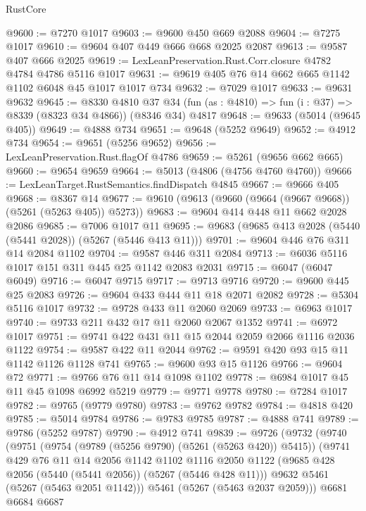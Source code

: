 \begin{lexlean}{RustCore}
\begin{coremodule}
@9600 := @7270 @1017
@9603 := @9600 @450 @669 @2088
@9604 := @7275 @1017
@9610 := @9604 @407 @449 @666 @668 @2025 @2087
@9613 := @9587 @407 @666 @2025
@9619 := LexLeanPreservation.Rust.Corr.closure @4782 @4784 @4786 @5116 @1017
@9631 := @9619 @405 @76 @14 @662 @665 @1142 @1102 @6048 @45 @1017 @1017 @734
@9632 := @7029 @1017
@9633 := @9631 @9632
@9645 := @8330
    @4810
    @37
    @34
    (fun (as : @4810) => fun (i : @37) => @8339 (@8323 @34 @4866))
    (@8346 @34)
    @4817
@9648 := @9633 (@5014 (@9645 @405))
@9649 := @4888 @734
@9651 := @9648 (@5252 @9649)
@9652 := @4912 @734
@9654 := @9651 (@5256 @9652)
@9656 := LexLeanPreservation.Rust.flagOf @4786
@9659 := @5261 (@9656 @662 @665)
@9660 := @9654 @9659
@9664 := @5013 (@4806 (@4756 @4760 @4760))
@9666 := LexLeanTarget.RustSemantics.findDispatch @4845
@9667 := @9666 @405
@9668 := @8367 @14
@9677 := @9610 (@9613 (@9660 (@9664 (@9667 @9668)) (@5261 (@5263 @405)) @5273))
@9683 := @9604 @414 @448 @11 @662 @2028 @2086
@9685 := @7006 @1017 @11
@9695 := @9683 (@9685 @413 @2028 (@5440 (@5441 @2028)) (@5267 (@5446 @413 @11)))
@9701 := @9604 @446 @76 @311 @14 @2084 @1102
@9704 := @9587 @446 @311 @2084
@9713 := @6036 @5116 @1017 @151 @311 @445 @25 @1142 @2083 @2031
@9715 := @6047 (@6047 @6049)
@9716 := @6047 @9715
@9717 := @9713 @9716
@9720 := @9600 @445 @25 @2083
@9726 := @9604 @433 @444 @11 @18 @2071 @2082
@9728 := @5304 @5116 @1017
@9732 := @9728 @433 @11 @2060 @2069
@9733 := @6963 @1017
@9740 := @9733 @211 @432 @17 @11 @2060 @2067 @1352
@9741 := @6972 @1017
@9751 := @9741 @422 @431 @11 @15 @2044 @2059 @2066 @1116 @2036 @1122
@9754 := @9587 @422 @11 @2044
@9762 := @9591 @420 @93 @15 @11 @1142 @1126 @1128 @741
@9765 := @9600 @93 @15 @1126
@9766 := @9604 @72
@9771 := @9766 @76 @11 @14 @1098 @1102
@9778 := @6984 @1017 @45 @11 @45 @1098 @6992 @5219
@9779 := @9771 @9778
@9780 := @7284 @1017
@9782 := @9765 (@9779 @9780)
@9783 := @9762 @9782
@9784 := @4818 @420
@9785 := @5014 @9784
@9786 := @9783 @9785
@9787 := @4888 @741
@9789 := @9786 (@5252 @9787)
@9790 := @4912 @741
@9839 := @9726
    (@9732
      (@9740
        (@9751
          (@9754 (@9789 (@5256 @9790) (@5261 (@5263 @420)) @5415))
          (@9741
            @429
            @76
            @11
            @14
            @2056
            @1142
            @1102
            @1116
            @2050
            @1122
            (@9685 @428 @2056 (@5440 (@5441 @2056)) (@5267 (@5446 @428 @11)))
            @9632
            @5461
            (@5267 (@5463 @2051 @1142)))
          @5461
          (@5267 (@5463 @2037 @2059)))
        @6681
        @6684
        @6687

\end{coremodule}
\end{lexlean}
